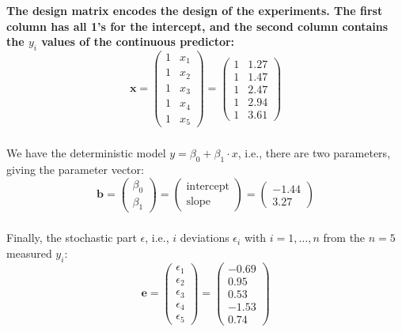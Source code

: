 \documentclass{beamer}
\begin{document}
\begin{frame}
    \frametitle{}
    \textbf{The design matrix encodes the design of the experiments. The first column has all 1's for the intercept, and the second column contains the $y_i$ values of the continuous predictor:}
    \begin{equation*}
        \mathbf{x} = \left( \begin{array}{cc} 1 & x_1 \\ 1 & x_2 \\ 1 & x_3 \\ 1 & x_4 \\ 1 & x_5 \end{array}\right) = \left( \begin{array}{cc} 1 & 1.27 \\ 1 & 1.47 \\ 1 & 2.47 \\ 1 & 2.94 \\ 1 & 3.61 \end{array}\right)
    \end{equation*}
\end{frame}

\begin{frame}
    \frametitle{}
    We have the deterministic model $y = \beta_0 + \beta_1 \cdot x$, i.e., there are two parameters, giving the parameter vector:
    \begin{equation*}
        \mathbf{b} = \left( \begin{array}{c} \beta_0 \\ \beta_1 \end{array}\right) = \left( \begin{array}{c} \text{intercept} \\ \text{slope} \end{array}\right) = \left( \begin{array}{c} -1.44 \\ 3.27 \end{array}\right)
    \end{equation*}
\end{frame}

\begin{frame}
    \frametitle{}
    Finally, the stochastic part $\epsilon$, i.e., $i$ deviations $\epsilon_i$ with $i = 1, \ldots, n$ from the $n = 5$ measured $y_i$:
    \begin{equation*}
        \mathbf{e} = \left( \begin{array}{c} \epsilon_1 \\ \epsilon_2 \\ \epsilon_3 \\ \epsilon_4 \\ \epsilon_5 \end{array}\right) = \left( \begin{array}{c} -0.69 \\ 0.95 \\ 0.53 \\ -1.53 \\ 0.74 \end{array}\right)
    \end{equation*}
\end{frame}
\end{document}
